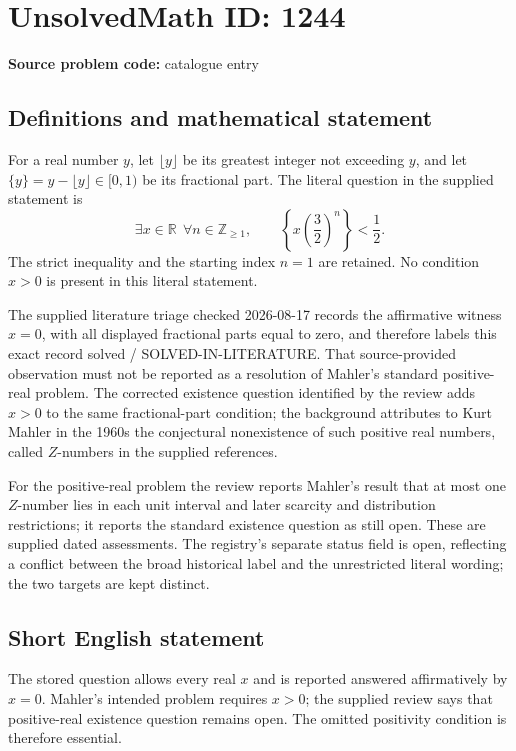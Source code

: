 \documentclass[11pt]{article}
\newcommand{\Z}{\mathbb{Z}}
\newcommand{\R}{\mathbb{R}}
\begin{document}
\section*{UnsolvedMath ID: 1244}
\textbf{Source problem code:} catalogue entry
\subsection{Definitions and mathematical statement}
For a real number $y$, let $\lfloor y\rfloor$ be its greatest integer not exceeding $y$, and let $\{y\}=y-\lfloor y\rfloor\in[0,1)$ be its fractional part. The literal question in the supplied statement is
\[\exists x\in\R\ \ \forall n\in\Z_{\geq1},\qquad \left\{x\left(\frac32\right)^n\right\}<\frac12.\]
The strict inequality and the starting index $n=1$ are retained. No condition $x>0$ is present in this literal statement.

The supplied literature triage checked 2026-08-17 records the affirmative witness $x=0$, with all displayed fractional parts equal to zero, and therefore labels this exact record solved / SOLVED-IN-LITERATURE. That source-provided observation must not be reported as a resolution of Mahler's standard positive-real problem. The corrected existence question identified by the review adds $x>0$ to the same fractional-part condition; the background attributes to Kurt Mahler in the 1960s the conjectural nonexistence of such positive real numbers, called $Z$-numbers in the supplied references.

For the positive-real problem the review reports Mahler's result that at most one $Z$-number lies in each unit interval and later scarcity and distribution restrictions; it reports the standard existence question as still open. These are supplied dated assessments. The registry's separate status field is open, reflecting a conflict between the broad historical label and the unrestricted literal wording; the two targets are kept distinct.
\subsection{Short English statement}
The stored question allows every real $x$ and is reported answered affirmatively by $x=0$. Mahler's intended problem requires $x>0$; the supplied review says that positive-real existence question remains open. The omitted positivity condition is therefore essential.
\end{document}
